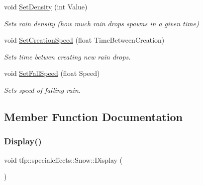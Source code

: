 \begin{DoxyCompactItemize}
void \mbox{\hyperlink{classtfp_1_1specialeffects_1_1_snow_aef492683dc08b2f0e28d21d1281919e4}{Set\+Density}} (int Value)
\begin{DoxyCompactList}\small\item\em Sets rain density (how much rain drops spawns in a given time) \end{DoxyCompactList}\item 
\mbox{\label{classtfp_1_1specialeffects_1_1_snow_aa8210d0ea3b0e9448272d78509daff8a}} 
void \mbox{\hyperlink{classtfp_1_1specialeffects_1_1_snow_aa8210d0ea3b0e9448272d78509daff8a}{Set\+Creation\+Speed}} (float Time\+Between\+Creation)
\begin{DoxyCompactList}\small\item\em Sets time betwen creating new rain drops. \end{DoxyCompactList}\item 
\mbox{\label{classtfp_1_1specialeffects_1_1_snow_a6342799828e09e66ae3b8e3230cc0f1f}} 
void \mbox{\hyperlink{classtfp_1_1specialeffects_1_1_snow_a6342799828e09e66ae3b8e3230cc0f1f}{Set\+Fall\+Speed}} (float Speed)
\begin{DoxyCompactList}\small\item\em Sets speed of falling rain. \end{DoxyCompactList}\end{DoxyCompactItemize}


\subsection{Member Function Documentation}
\mbox{\label{classtfp_1_1specialeffects_1_1_snow_a02d2fd7f0d7420c0f333fe7fe234ab3d}} 
\subsubsection{\texorpdfstring{Display()}{Display()}}
{\footnotesize\ttfamily void tfp\+::specialeffects\+::\+Snow\+::\+Display (\begin{DoxyParamCaption}{ }\end{DoxyParamCaption})}



